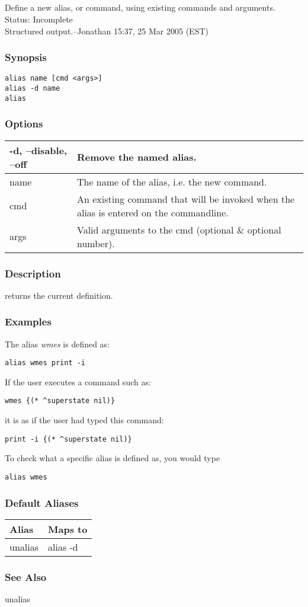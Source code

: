 \subsection{}
\label{alias}
Define a new alias, or command, using existing commands and arguments.\\ 
 Status: Incomplete\\ 
Structured output.--Jonathan 15:37, 25 Mar 2005 (EST) 
\subsubsection*{Synopsis}
  \begin{verbatim}
alias name [cmd <args>]
alias -d name
alias
\end{verbatim}
\subsubsection*{Options}
\begin{tabular}{|l|l|}
\hline 
 -d, --disable, --off  & Remove the named alias.  \\
 \hline 
 name  & The name of the alias, i.e. the new command.  \\
 \hline 
 cmd  & An existing command that will be invoked when the alias is entered on the commandline.  \\
 \hline 
 args  & Valid arguments to the cmd (optional \& optional number).  \\
 \hline 
\end{tabular}
\subsubsection*{Description}
 returns the current definition. 
\subsubsection*{Examples}
 The alias \emph{wmes}
 is defined as: \begin{verbatim}
alias wmes print -i
\end{verbatim}
 If the user executes a command such as: \begin{verbatim}
wmes {(* ^superstate nil)}
\end{verbatim}
 it is as if the user had typed this command: \begin{verbatim}
print -i {(* ^superstate nil)}
\end{verbatim}
 To check what a specific alias is defined as, you would type \begin{verbatim}
alias wmes
\end{verbatim}
\subsubsection*{Default Aliases}
\begin{tabular}{|l|l|}
\hline 
 Alias  & Maps to  \\
 \hline 
 unalias  & alias -d  \\
 \hline 
\end{tabular}
\subsubsection*{See Also}
 unalias
